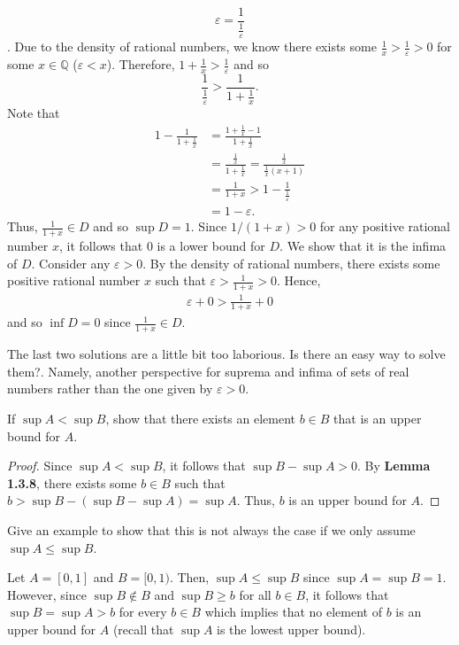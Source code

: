 \documentclass[12pt]{article}
\newcommand{\Q}{\mathbb{Q}}
\newenvironment{problem}[2][Problem]{\begin{trivlist}
		\item[\hskip \labelsep {\bfseries #1}\hskip \labelsep {\bfseries #2.}]}{\end{trivlist}}
\newenvironment{solution}[2][Solution]{\begin{trivlist}
		\item[\hskip \labelsep {\bfseries #1}\hskip \labelsep {\bfseries #2.}]}{\end{trivlist}}
\begin{document}
\begin{problem}{1.3.8}
\begin{enumerate}[label=(\alph*)]
\begin{solution}{d}
		 \[\varepsilon = \frac{1}{\frac{1}{\varepsilon}}\].
		 Due to the density of rational numbers, we know there exists some $\frac{1}{x} > \frac{1}{\varepsilon}>0$ for some $x\in \Q$ ($\varepsilon < x$). Therefore, $1+\frac{1}{x} > \frac{1}{\varepsilon}$ and so 
		 \begin{equation*}
		 	\frac{1}{\frac{1}{\varepsilon}} > \frac{1}{1+\frac{1}{x}}.
		 \end{equation*}
	 Note that 
	 \begin{align*}
	 	1-\frac{1}{1+\frac{1}{x}} &= \frac{1+\frac{1}{x}-1}{1+\frac{1}{x}}\\
	 	&= \frac{\frac{1}{x}}{1+\frac{1}{x}} = \frac{\frac{1}{x}}{\frac{1}{x}(x+1)}\\
	 	&= \frac{1}{1+x}> 1-\frac{1}{\frac{1}{\varepsilon}}\\
	 	&= 1-\varepsilon.
	 \end{align*}
 	Thus, $\frac{1}{1+x}\in D$ and so $\sup D = 1$. Since $1/(1+x) >0$ for any positive rational number $x$, it follows that $0$ is a lower bound for $D$. We show that it is the infima of $D$. Consider any $\varepsilon>0$. By the density of rational numbers, there exists some positive rational number $x$ such that $\varepsilon > \frac{1}{1+x} > 0$. Hence, 
 	\begin{align*}
 		\varepsilon + 0>\frac{1}{1+x}+0
 	\end{align*}
 	and so $\inf D = 0$ since $\frac{1}{1+x}\in D$.
		\end{solution}
			\end{enumerate}
		\end{problem}
	The last two solutions are a little bit too laborious. Is there an easy way to solve them?. Namely, another perspective for suprema and infima of sets of real numbers rather than the one given by $\varepsilon >0$. 
	
		\begin{problem}{1.3.9}
			\begin{enumerate}[label=(\alph*)]
				\item If $\sup A < \sup B$, show that there exists an element $b\in B$ that is an upper bound for $A$.
				\begin{proof}
				 Since $\sup A < \sup B$, it follows that $\sup B-\sup A > 0$. By \textbf{Lemma 1.3.8}, there exists some $b\in B$ such that $b>\sup B - (\sup B- \sup A) = \sup A$. Thus, $b$ is an upper bound for $A$.
				\end{proof}
				\item Give an example to show that this is not always the case if we only assume $\sup A \leq \sup B$.
				\begin{solution}{b}
					Let $A=[0,1]$ and $B=[0,1)$. Then, $\sup A \leq \sup B$ since $\sup A = \sup B = 1$.  However, since $\sup B\not\in B$ and $\sup B \geq b$ for all $b\in B$, it follows that $\sup B = \sup A > b$ for every $b\in B$ which implies that no element of $b$ is an upper bound for $A$ (recall that $\sup A$ is the lowest upper bound). 
				\end{solution}
			\end{enumerate}
		\end{problem}
\end{document}
